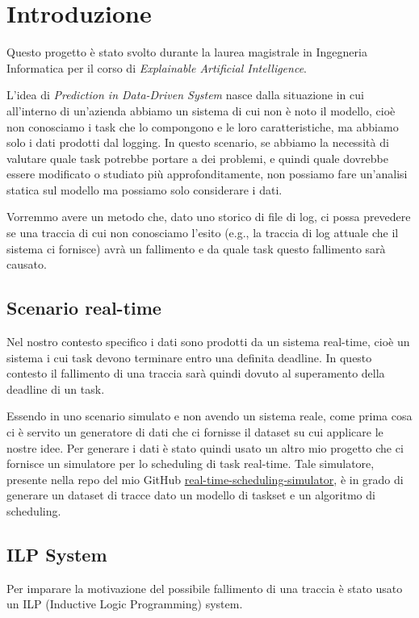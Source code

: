 \chapter{Introduzione}
Questo progetto è stato svolto durante la laurea magistrale in Ingegneria Informatica per il corso di \textit{Explainable Artificial Intelligence}.

L'idea di \textit{Prediction in Data-Driven System} nasce dalla situazione in cui all'interno di un'azienda abbiamo un sistema di cui non è noto il modello, cioè non conosciamo i task che lo compongono e le loro caratteristiche, ma abbiamo solo i dati prodotti dal logging. In questo scenario, se abbiamo la necessità di valutare quale task potrebbe portare a dei problemi, e quindi quale dovrebbe essere modificato o studiato più approfonditamente, non possiamo fare un'analisi statica sul modello ma possiamo solo considerare i dati.

Vorremmo avere un metodo che, dato uno storico di file di log, ci possa prevedere se una traccia di cui non conosciamo l'esito (e.g., la traccia di log attuale che il sistema ci fornisce) avrà un fallimento e da quale task questo fallimento sarà causato.

\section{Scenario real-time}
Nel nostro contesto specifico i dati sono prodotti da un sistema real-time, cioè un sistema i cui task devono terminare entro una definita deadline. In questo contesto il fallimento di una traccia sarà quindi dovuto al superamento della deadline di un task.

Essendo in uno scenario simulato e non avendo un sistema reale, come prima cosa ci è servito un generatore di dati che ci fornisse il dataset su cui applicare le nostre idee. Per generare i dati è stato quindi usato un altro mio progetto che ci fornisce un simulatore per lo scheduling di task real-time. Tale simulatore, presente nella repo del mio GitHub \href{https://github.com/edoardosarri24/real-time-scheduling-simulator}{real-time-scheduling-simulator}, è in grado di generare un dataset di tracce dato un modello di taskset e un algoritmo di scheduling.

\section{ILP System}
\label{sec:numsynth}
Per imparare la motivazione del possibile fallimento di una traccia è stato usato un ILP (Inductive Logic Programming) system.

